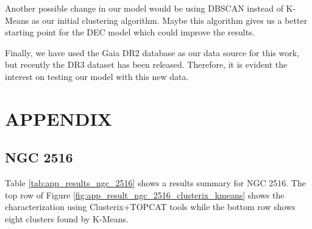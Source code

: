 \documentclass[11pt,a4paper,english,twocolumn]{article}
\begin{document}
Another possible change in our model would be using DBSCAN instead of K-Means
as our initial clustering algorithm. Maybe this algorithm gives us a better starting
point for the DEC model which could improve the results.

Finally, we have used the Gaia DR2 database as our data source for this work,
but recently the DR3 dataset has been released.
Therefore, it is evident the interest on testing our model with this new data.

\appendix
\section{APPENDIX}
\label{sec:appendix}

\subsection{NGC 2516}
\label{sec:ngc2516}

\begin{table}[htbp]
  \begin{center}
    \caption{NGC 2516 results.}
    \label{tab:app_results_ngc_2516}
  \end{center}
\end{table}

Table \ref{tab:app_results_ngc_2516} shows a results summary for NGC 2516.
The top row of Figure \ref{fig:app_result_ngc_2516_clusterix_kmeans} shows
the characterization using Clusterix+TOPCAT tools while the bottom row
shows eight clusters found by K-Means.
\end{document}
